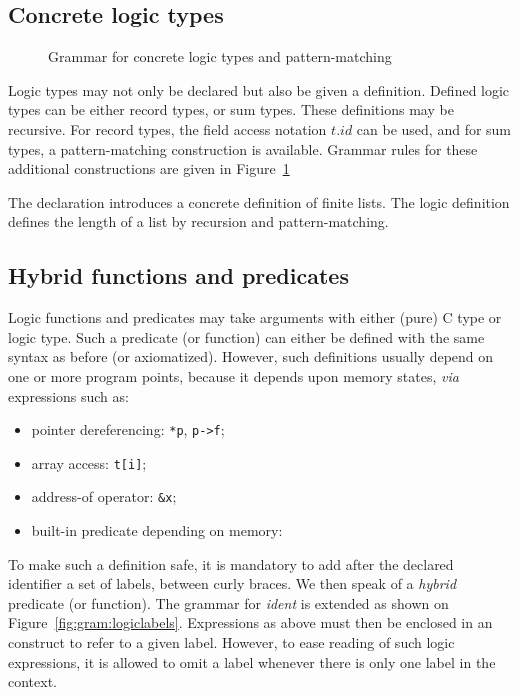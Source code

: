\subsection{Concrete logic types}\label{sec:concrete-logic-types}
\experimental

\begin{figure}[t]
  \begin{cadre}
      
    \end{cadre}
  \caption{Grammar for concrete logic types and pattern-matching}
\label{fig:gram:logictype}
\end{figure}

Logic types may not only be declared but also be given a
definition. Defined logic types can be either record
types, or sum
types. These definitions may be recursive.
For record types, the field access notation $t.id$ can be used, and
for sum types, a pattern-matching construction is available.
Grammar rules for these additional constructions are given in
Figure~\ref{fig:gram:logictype}

\begin{example}
  The declaration
  introduces a concrete definition of finite lists. The logic definition
  defines the length of a list by recursion and pattern-matching.
\end{example}


\subsection{Hybrid functions and predicates}
\label{sec:logicalstates}

Logic functions and predicates may take arguments with
either (pure) C type or logic
type. Such a predicate (or function)
can either be defined with the same syntax as before (or axiomatized).
However, such definitions usually depend on one or
more program points, because it depends upon memory states, \emph{via}
expressions such as:
\begin{itemize}
\item pointer dereferencing: \lstinline|*p|, \lstinline|p->f|;
\item array access: \lstinline|t[i]|;
\item address-of operator: \lstinline|&x|;
\item built-in predicate depending on memory: \valid
\end{itemize}
To make such a definition safe, it is mandatory to add after the
declared identifier a set of labels, between curly braces. We then speak
of a \textit{hybrid} predicate (or function).
The grammar for \textit{ident} is extended as shown on
Figure~\ref{fig:gram:logiclabels}. Expressions
as above must then be enclosed in an \at{} construct to refer to a
given label. However, to ease reading of such logic expressions, it
is allowed to omit a label whenever there is only one label in the
context.


